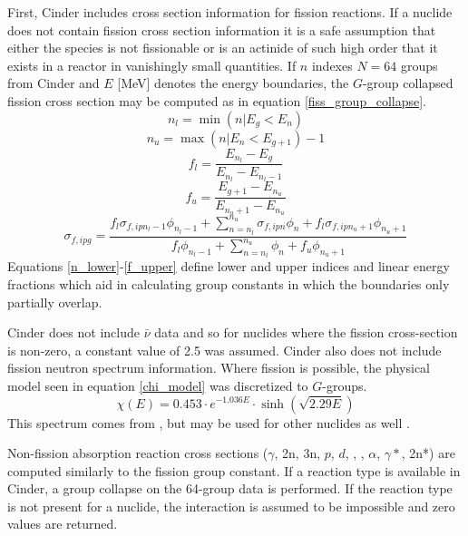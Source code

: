 First, Cinder includes cross section information for fission reactions.  If a nuclide does not 
contain fission cross section information it is a safe assumption that either the species 
is not fissionable or is an actinide of such high order that it exists in a reactor in vanishingly 
small quantities.  If $n$ indexes $N=64$ groups from Cinder and $E$ [MeV] denotes the energy boundaries, 
the $G$-group collapsed fission cross section may be computed as in equation \ref{fiss_group_collapse}.
\begin{equation}
\label{n_lower}
n_l = \min(n|E_g<E_n)
\end{equation}
\begin{equation}
\label{n_upper}
n_u = \max(n|E_n<E_{g+1}) - 1
\end{equation}
\begin{equation}
\label{f_lower}
f_l = \frac{E_{n_l} - E_g}{E_{n_l} - E_{n_l-1}}
\end{equation}
\begin{equation}    
\label{f_upper}
f_u = \frac{E_{g+1} - E_{n_u}}{E_{n_u+1} - E_{n_u}}
\end{equation}
\begin{equation}
\label{fiss_group_collapse}
\sigma_{f,ipg} = \frac{f_l\sigma_{f,ipn_l-1}\phi_{n_l-1} + \sum_{n=n_l}^{n_u} \sigma_{f,ipn}\phi_n + f_l\sigma_{f,ipn_u+1}\phi_{n_u+1}}{f_l\phi_{n_l-1} + \sum_{n=n_l}^{n_u} \phi_n  + f_u\phi_{n_u+1}}
\end{equation}
Equations \ref{n_lower}-\ref{f_upper} define lower and upper indices and linear energy fractions
which aid in calculating group constants in which the boundaries only partially overlap.

Cinder does not include $\bar{\nu}$ data and so for nuclides where the fission cross-section is 
non-zero, a constant value of 2.5 was assumed. Cinder also does not include fission neutron 
spectrum information.  Where fission is possible, the physical model seen in equation \ref{chi_model}
was discretized to $G$-groups.
\begin{equation}
\label{chi_model}
\chi(E) = 0.453 \cdot e^{-1.036E} \cdot \sinh\left(\sqrt{2.29E}\right)
\end{equation}
This spectrum comes from , but may be used for other nuclides as well \cite{Lamarsh2002}.

Non-fission absorption reaction cross sections ($\gamma$, 2n, 3n, $p$, $d$, , , 
$\alpha$, $\gamma*$, 2n*) are computed similarly to the fission group constant.  If a reaction 
type is available in Cinder, a group collapse on the 64-group data is performed.  If the reaction 
type is not present for a nuclide, the interaction is assumed to be impossible and zero values
are returned.

